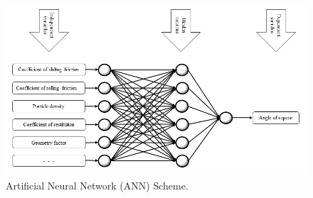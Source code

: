 \begin{figure}[!htb]
\centering
\includegraphics[width=.96\columnwidth]{images/129NN22}
\caption[ANN Scheme]{Artificial Neural Network (\acs{ANN}) Scheme.}
\label{fig:018nnscheme}
\end{figure}